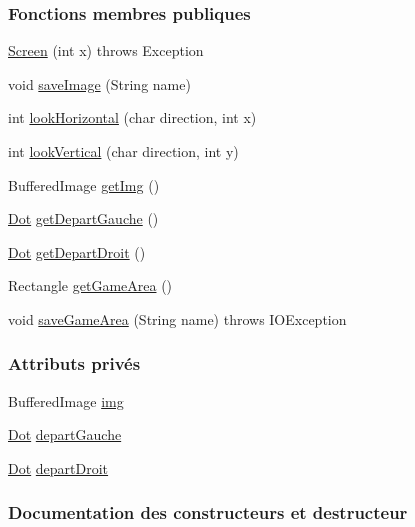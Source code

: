 \subsubsection*{Fonctions membres publiques}
\begin{DoxyCompactItemize}
\item 
\hyperlink{classmain_1_1Screen_a16e0c34fd54f68cc52aed7ca84b685a5}{Screen} (int x)  throws Exception 
\item 
void \hyperlink{classmain_1_1Screen_a6020608f69e831e1272e65ca889c2982}{save\+Image} (String name)
\item 
int \hyperlink{classmain_1_1Screen_a39327388590ecce402d8e824d3e84ec5}{look\+Horizontal} (char direction, int x)
\item 
int \hyperlink{classmain_1_1Screen_ab9ade1ee9d9b5d545e31a724c7580b47}{look\+Vertical} (char direction, int y)
\item 
Buffered\+Image \hyperlink{classmain_1_1Screen_ab6440c8bbc64bc49850da4f1198aca5c}{get\+Img} ()
\item 
\hyperlink{classmain_1_1Dot}{Dot} \hyperlink{classmain_1_1Screen_acbb85481ef1d283884f71a0fd189d600}{get\+Depart\+Gauche} ()
\item 
\hyperlink{classmain_1_1Dot}{Dot} \hyperlink{classmain_1_1Screen_ade6fff051b337f330e35f9a847640fad}{get\+Depart\+Droit} ()
\item 
Rectangle \hyperlink{classmain_1_1Screen_ad2822e6ea3cdfdbccb82c734c342dfb8}{get\+Game\+Area} ()
\item 
void \hyperlink{classmain_1_1Screen_ae81e7d3244bd7eb9ed0b05c8a37f37a0}{save\+Game\+Area} (String name)  throws I\+O\+Exception 
\end{DoxyCompactItemize}
\subsubsection*{Attributs privés}
\begin{DoxyCompactItemize}
\item 
Buffered\+Image \hyperlink{classmain_1_1Screen_aa7f8e8fdd911afa3e27ebd437fe7d8e4}{img}
\item 
\hyperlink{classmain_1_1Dot}{Dot} \hyperlink{classmain_1_1Screen_aa0efb77861026c69cdb5675e2734fdf7}{depart\+Gauche}
\item 
\hyperlink{classmain_1_1Dot}{Dot} \hyperlink{classmain_1_1Screen_a52e30ddaea8ea41ef67c2e9b436896f2}{depart\+Droit}
\end{DoxyCompactItemize}


\subsubsection{Documentation des constructeurs et destructeur}
\hypertarget{classmain_1_1Screen_a16e0c34fd54f68cc52aed7ca84b685a5}{}
